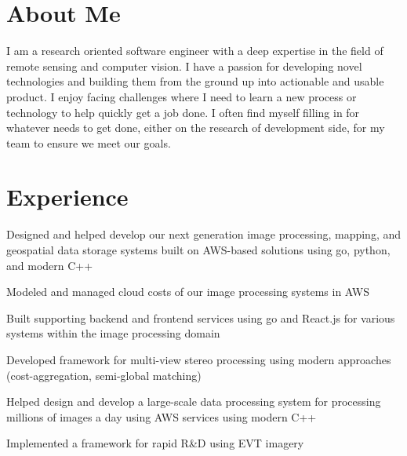 \documentclass[]{nilosek-resume}
\begin{document}
\begin{minipage}[t]{0.7\textwidth} 


\section{About Me}
I am a research oriented software engineer with a deep expertise in the field of remote sensing and computer vision. I have a passion for developing novel technologies and building them from the ground up into actionable and usable product. I enjoy facing challenges where I need to learn a new process or technology to help quickly get a job done. I often find myself filling in for whatever needs to get done, either on the research of development side, for my team to ensure we meet our goals.


\section{Experience}
\vspace{\topsep} %
\begin{tightemize}
	\item Designed and helped develop our next generation image processing, mapping, and geospatial data storage systems built on AWS-based solutions using go, python, and modern C++
	\item Modeled and managed cloud costs of our image processing systems in AWS
	\item Built supporting backend and frontend services using go and React.js for various systems within the image processing domain
\end{tightemize}
\sectionsep

\begin{tightemize}
	\item Developed framework for multi-view stereo processing using modern approaches (cost-aggregation, semi-global matching)
	\item Helped design and develop a large-scale data processing system for processing millions of images a day using AWS services using modern C++
	\item Implemented a framework for rapid R\&D using EVT imagery 
\end{tightemize}
\sectionsep


\end{minipage}
\end{document}
